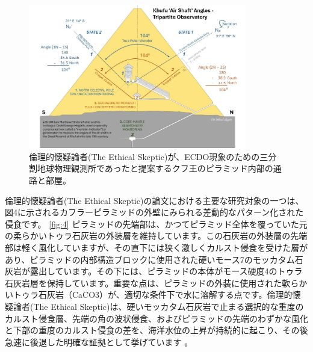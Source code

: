 \documentclass[10pt,twocolumn,letterpaper]{article}
\begin{document}
\begin{figure}[b]
\begin{center}
\includegraphics[width=0.85\textwidth]{shafts.jpg}
\end{center}
   \caption{倫理的懐疑論者(The Ethical Skeptic)が、ECDO現象のための三分割地球物理観測所であったと提案するクフ王のピラミッド内部の通路と部屋\cite{28}。}
\label{fig:5}
\end{figure}
倫理的懐疑論者(The Ethical Skeptic)の論文における主要な研究対象の一つは、図4に示されるカフラーピラミッドの外壁にみられる差動的なパターン化された侵食です。 \ref{fig:4} ピラミッドの先端部は、かつてピラミッド全体を覆っていた元の柔らかいトゥラ石灰岩の外装層を維持しています。この石灰岩の外装層の先端部は軽く風化していますが、その直下には狭く激しくカルスト侵食を受けた層があり、ピラミッドの内部構造ブロックに使用された硬いモース7のモッカタム石灰岩が露出しています。その下には、ピラミッドの本体がモース硬度4のトゥラ石灰岩層を保持しています。重要な点は、ピラミッドの外装に使用された軟らかいトゥラ石灰岩（CaCO3）が、適切な条件下で水に溶解する点です。倫理的懐疑論者(The Ethical Skeptic)は、硬いモッカタム石灰岩で止まる選択的な重度のカルスト侵食層、先端の角の波状侵食、およびピラミッドの先端のわずかな風化と下部の重度のカルスト侵食の差を、海洋水位の上昇が持続的に起こり、その後急速に後退した明確な証拠として挙げています \cite{27}。

\end{document}
